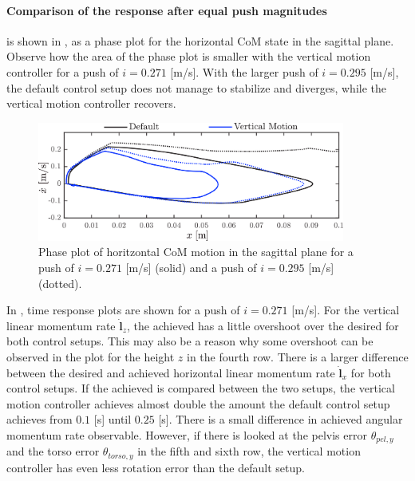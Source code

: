 \paragraph{Comparison of the response after equal push magnitudes} is shown in , as a phase plot for the horizontal \ac{CoM} state in the sagittal plane. Observe how the area of the phase plot is smaller with the vertical motion controller for a push of $i=0.271$ [m/s]. With the larger push of $i=0.295$ [m/s], the default control setup does not manage to stabilize and diverges, while the vertical motion controller recovers.
\begin{figure}
\centering
\includegraphics[width=0.9\textwidth]{STYLESTUFF/valcomparephase.png}
\caption{Phase plot of horitzontal \ac{CoM} motion in the sagittal plane for a push of $i=0.271$ [m/s] (solid) and a push of $i=0.295$ [m/s] (dotted).}
\label{fig:valcomparephase}
\end{figure}

In , time response plots are shown for a push of $i=0.271$ [m/s]. For the vertical linear momentum rate $\dot{\mathbf{l}}_z$, the achieved has a little overshoot over the desired for both control setups. This may also be a reason why some overshoot can be observed in the plot for the height $z$ in the fourth row. There is a larger difference between the desired and achieved horizontal linear momentum rate $\dot{\mathbf{l}}_x$ for both control setups. If the achieved is compared between the two setups, the vertical motion controller achieves almost double the amount the default control setup achieves from $0.1$ [s] until $0.25$ [s]. There is a small difference in achieved angular momentum rate observable. However, if there is looked at the pelvis error $\theta_{pel,y}$ and the torso error $\theta_{torso,y}$ in the fifth and sixth row, the vertical motion controller has even less rotation error than the default setup. 

